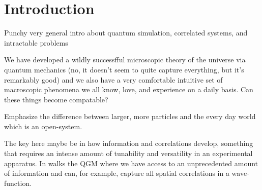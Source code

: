 



\chapter{Introduction}
\label{introduction}


Punchy very general intro about quantum simulation, correlated systems, and intractable problems

We have developed a wildly successfful microscopic theory of the universe via quantum mechanics (no, it doesn't seem to quite capture everything, but it's remarkably good) and we also have a very comfortable intuitive set of macroscopic phenomena we all know, love, and experience on a daily basis. Can these things become compatable? 

Emphasize the difference between larger, more particles and the every day world which is an open-system.

The key here maybe be in how information and correlations develop, something that requires an intense amount of tunability and versatility in an experimental apparatus. In walks the QGM where we have access to an unprecedented amount of information and can, for example, capture all spatial correlations in a wave-function.




